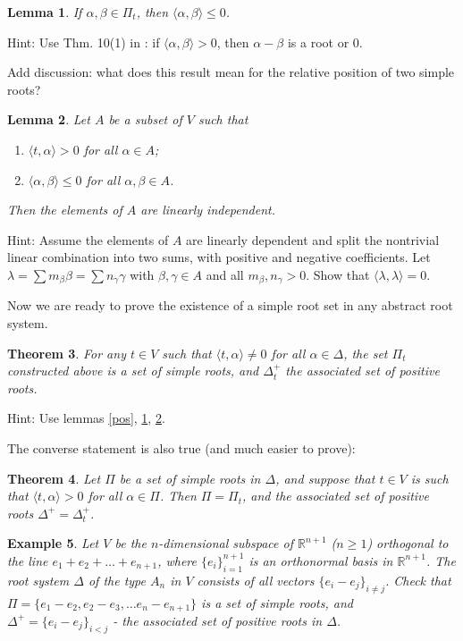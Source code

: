 \documentclass[11pt]{amsart}
\newcommand{\R}{\mathbb R}
\newtheorem{theorem}{Theorem}
\newtheorem{lemma}[theorem]{Lemma}
\newtheorem{example}[theorem]{Example}
\begin{document}
\begin{lemma} \label{angle} 
If $\alpha, \beta \in \Pi_t$, then $\langle \alpha, \beta \rangle \leq 0$. 
\end{lemma}
Hint: Use Thm. 10(1) in \cite{1} : if $\langle \alpha, \beta \rangle >0$, 
then $\alpha - \beta$ is a root or $0$. 

Add discussion: what does this result mean for the relative position 
of two simple roots? 

\begin{lemma} \label{basis}
Let $A$ be a subset of $V$ such that 
\begin{enumerate} 
\item{$\langle t, \alpha \rangle >0$ for all $\alpha \in A$;}
\item{$\langle \alpha, \beta \rangle \leq 0$ for all $\alpha, \beta \in A$.}
\end{enumerate}
Then the elements of $A$ are linearly independent. 
\end{lemma}
Hint: Assume the elements of $A$ are linearly dependent and split the 
nontrivial linear combination into two sums, 
with positive and negative coefficients. 
Let $\lambda = \sum m_\beta \beta = \sum n_\gamma \gamma$ with 
$\beta, \gamma \in A$ and all $ m_\beta , n_\gamma >0$. Show that 
$\langle \lambda, \lambda \rangle =0$. 

Now we are ready to prove the existence of a simple root set   
in any abstract root system.    

\begin{theorem} \label{simple}
For any $t \in V$ such that $\langle t, \alpha \rangle \neq 0$ for all 
$\alpha \in \Delta$, the set $\Pi_t$ constructed above is a set of simple 
roots, and $\Delta_t^+$ the associated set of positive roots. 
\end{theorem} 
Hint: Use lemmas \ref{pos}, \ref{angle}, \ref{basis}. 

The converse statement is also true (and much easier to prove): 
\begin{theorem} Let $\Pi$ be a set of simple roots in $\Delta$, and 
suppose that $t \in V$ is such that $\langle t, \alpha \rangle >0$ for all 
$\alpha \in \Pi$. Then $\Pi = \Pi_t$, and the associated set of positive 
roots $\Delta^+ = \Delta_t^+$. 
\end{theorem} 


\begin{example} Let $V$ be the 
$n$-dimensional subspace 
of $\R^{n+1}$ ($n \geq 1$) orthogonal to the line 
$e_1 + e_2 + \ldots + e_{n+1}$,
where $\{e_i\}_{i=1}^{n+1}$ is an orthonormal basis in $\R^{n+1}$. 
The root system $\Delta$ of the type $A_n$ in $V$ 
consists of all 
vectors $\{ e_i - e_j\}_{ i \neq j }$.  
 Check that $\Pi = \{ e_1 - e_2, e_2 - e_3, \ldots e_n -e_{n+1} \}$ is 
a set of simple roots, and $\Delta^+ = \{ e_i - e_j\}_{i<j}$ - the 
associated set of positive roots in $\Delta$. 
\end{example}  
\end{document}

